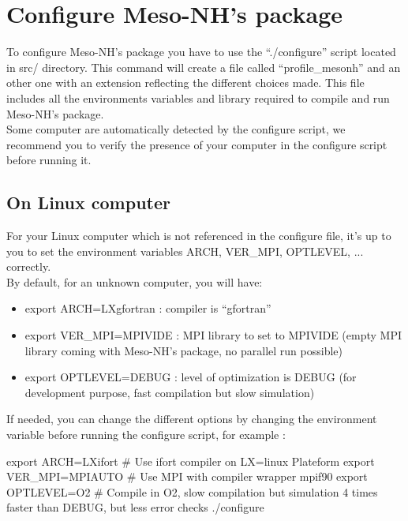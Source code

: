 \section{Configure Meso-NH's package}
\label{sec:configure_mesonh_package}
  
To configure Meso-NH's package you have to use the ``./configure'' script located in src/ directory. This command will create a file called ``profile\_mesonh'' and an other one with an extension reflecting the different choices made. This file includes all the environments variables and library required to compile and run Meso-NH's package. \\

Some computer are automatically detected by the configure script, we recommend you to verify the presence of your computer in the configure script before running it.

\subsection{On Linux computer}

For your Linux computer which is not referenced in the configure file, it's up to you to set the environment variables ARCH, VER\_MPI, OPTLEVEL, ... correctly. \\

By default, for an unknown computer, you will have:
\begin{itemize}
\item export ARCH=LXgfortran : compiler is ``gfortran''
\item export VER\_MPI=MPIVIDE : MPI library to set to MPIVIDE (empty MPI library coming with Meso-NH's package, no parallel run possible)
\item export OPTLEVEL=DEBUG : level of optimization is DEBUG (for development purpose, fast compilation but slow simulation) \\
\end{itemize} 

If needed, you can change the different options by changing the environment variable before running the configure script, for example :
\begin{bashcode}
export ARCH=LXifort        # Use ifort compiler on LX=linux Plateform 
export VER_MPI=MPIAUTO     # Use MPI with compiler wrapper mpif90
export OPTLEVEL=O2         # Compile in O2, slow compilation but simulation 4 times faster than DEBUG, but less error checks
 ./configure 
\end{bashcode}

